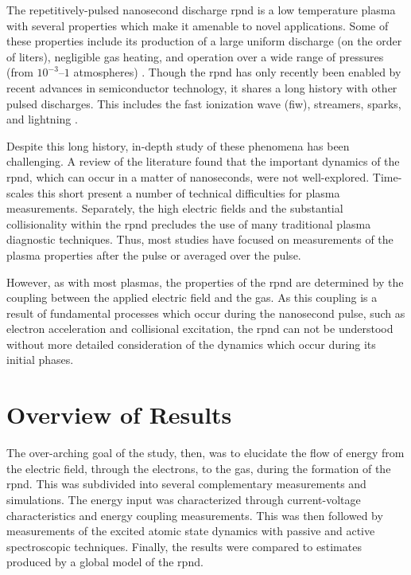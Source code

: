 The repetitively-pulsed nanosecond discharge \acs{rpnd} is a low temperature
plasma with several properties which make it amenable to novel applications.
Some of these properties include its production of a large uniform discharge (on
the order of liters), negligible gas heating, and operation over a wide range of
pressures (from $10^{-3}$--$1$ atmospheres) \cite{Starikovskaia2001}. Though the
\acs{rpnd} has only recently been enabled by recent advances in semiconductor
technology, it shares a long history with other pulsed discharges. This includes
the fast ionization wave (\acs{fiw}), streamers, sparks, and lightning
\cite{Loeb1965}.

Despite this long history, in-depth study of these phenomena has been
challenging. A review of the literature found that the important dynamics of the
\acs{rpnd}, which can occur in a matter of nanoseconds, were not well-explored.
Time-scales this short present a number of technical difficulties for plasma
measurements. Separately, the high electric fields and the substantial
collisionality within the \acs{rpnd} precludes the use of many traditional
plasma diagnostic techniques. Thus, most studies have focused on measurements of
the plasma properties after the pulse or averaged over the pulse.

However, as with most plasmas, the properties of the \acs{rpnd} are determined
by the coupling between the applied electric field and the gas. As this coupling
is a result of fundamental processes which occur during the nanosecond pulse,
such as electron acceleration and collisional excitation, the \acs{rpnd} can not
be understood without more detailed consideration of the dynamics which occur
during its initial phases.

\section{Overview of Results}

The over-arching goal of the study, then, was to elucidate the flow of energy
from the electric field, through the electrons, to the gas, during the formation
of the \acs{rpnd}. This was subdivided into several complementary measurements
and simulations. The energy input was characterized through current-voltage
characteristics and energy coupling measurements. This was then followed by
measurements of the excited atomic state dynamics with passive and active
spectroscopic techniques. Finally, the results were compared to estimates
produced by a global model of the \acs{rpnd}.

